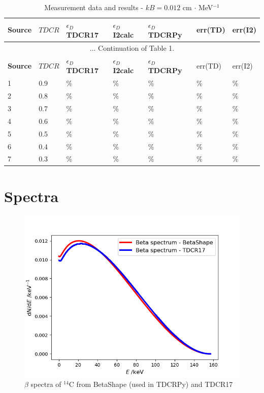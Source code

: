 \documentclass[12pt]{iopart}
\begin{document}
\begingroup
\footnotesize
\begin{longtable}[l]{| p{} | p{} |p{} |p{} |p{} |p{} |p{} |} 
\caption{Measurement data and results - $kB = 0.012$ cm $\cdot$ MeV$^{-1}$}
\label{Table1} \\ 
\hline
\textbf{Source} & \textbf{$TDCR$} & \textbf{$\epsilon_{D}$ TDCR17} & \textbf{$\epsilon_{D}$ I2calc} & \textbf{$\epsilon_{D}$ TDCRPy} & err(TD)& err(I2) \\ 
\endfirsthead
\multicolumn{7}{c}{... Continuation of Table 1.}\\ 
\hline
 \textbf{Source} & \textbf{$TDCR$} & \textbf{$\epsilon_{D}$ TDCR17} & \textbf{$\epsilon_{D}$ I2calc} & \textbf{$\epsilon_{D}$ TDCRPy} & err(TD)& err(I2) \\   \hline 
\endhead
\hline
 1 & 0.9   &    \% & \% &  \% &   \% &   \%\\
 2 & 0.8   &    \% & \% &  \% &   \% &   \%\\
 3 & 0.7   &    \% & \% &  \% &   \% &   \%\\
 4 & 0.6   &    \% & \% &  \% &   \% &   \%\\
 5 & 0.5   &    \% & \% &  \% &   \% &   \%\\
 6 & 0.4   &    \% & \% &  \% &   \% &   \%\\
 7 & 0.3   &    \% & \% &  \% &   \% &   \%\\
\hline
\end{longtable} 
\endgroup

\pagebreak
\section{Spectra}

\begin{figure}[h!]
\centering
\includegraphics[scale=0.4]{../decayData/spectra/BetaSpectrum_C-14.png}
\caption{$\beta$ spectra of $^{14}$C from BetaShape (used in TDCRPy) and TDCR17}
\label{fig:C-14}
\end{figure}
\end{document}
